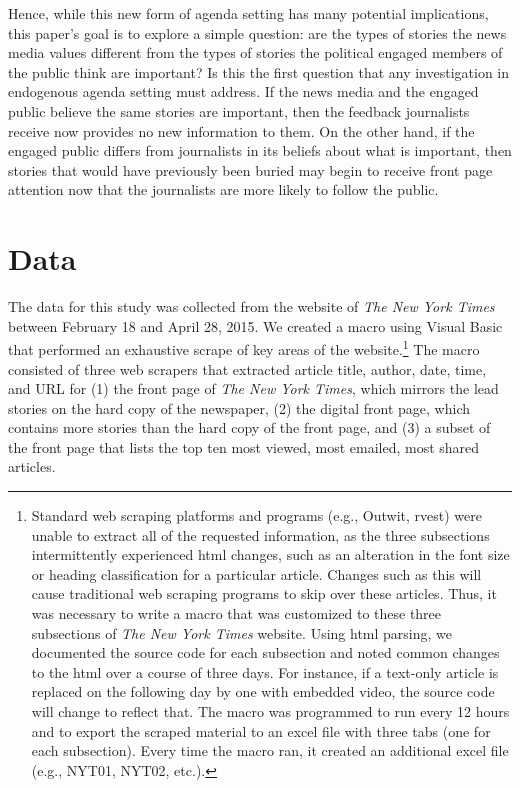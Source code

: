 \documentclass[12pt]{article}
\begin{document}
\begin{doublespace}
Hence, while this new form of agenda setting has many potential implications, this paper's goal is to explore a simple question: are the types of stories the news media values different from the types of stories the political engaged members of the public think are important? Is this the first question that any investigation in endogenous agenda setting must address. If the news media and the engaged public believe the same stories are important, then the feedback journalists receive now provides no new information to them. On the other hand, if the engaged public differs from journalists in its beliefs about what is important, then stories that would have previously been buried may begin to receive front page attention now that the journalists are more likely to follow the public.


\section{Data} 
The data for this study was collected from the website of \textit{The New York Times} between February 18 and April 28, 2015. We created a macro using Visual Basic that performed an exhaustive scrape of key areas of the website.\footnote{Standard web scraping platforms and programs (e.g., Outwit, rvest) were unable to extract all of the requested information, as the three subsections intermittently experienced html changes, such as an alteration in the font size or heading classification for a particular article.  Changes such as this will cause traditional web scraping programs to skip over these articles. Thus, it was necessary to write a macro that was customized to these three subsections of \textit{The New York Times} website. Using html parsing, we documented the source code for each subsection and noted common changes to the html over a course of three days. For instance, if a text-only article is replaced on the following day by one with embedded video, the source code will change to reflect that. The macro was programmed to run every 12 hours and to export the scraped material to an excel file with three tabs (one for each subsection). Every time the macro ran, it created an additional excel file (e.g., NYT01, NYT02, etc.).} The macro consisted of three web scrapers that extracted article title, author, date, time, and URL for (1) the front page of \textit{The New York Times}, which mirrors the lead stories on the hard copy of the newspaper, (2) the digital front page, which contains more stories than the hard copy of the front page, and (3) a subset of the front page that lists the top ten most viewed, most emailed, most shared articles.


\end{doublespace}
\end{document}
